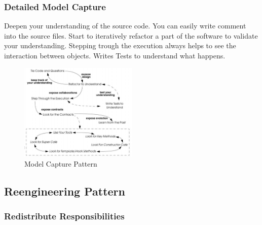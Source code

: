 \subsubsection{Detailed Model Capture}
Deepen your understanding of the source code. You can easily write comment into the source files. Start to iteratively refactor a part of the software to validate your understanding. Stepping trough the execution always helps to see the interaction between objects. Writes Tests to understand what happens.
\begin{figure}[H]
\centering
\includegraphics[width=0.5\textwidth]{figures/ModelCapture.PNG}
\caption{Model Capture Pattern}
\end{figure}




























\subsection{Reengineering Pattern}
\hypertarget{redistribute-responsibilities}{%
\subsubsection{Redistribute
Responsibilities}\label{redistribute-responsibilities}}

